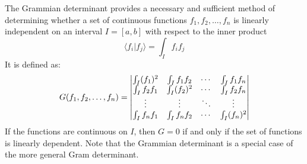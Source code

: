 \documentclass[12pt]{article}
\begin{document}
The Grammian determinant provides a necessary and sufficient method of determining whether a set of continuous functions ${f_1, f_2, \dotsc, f_n}$ is linearly independent on an interval $I = [a, b]$ with respect to the inner product 
$$\langle f_i | f_j\rangle = \int_I f_if_j$$ 
It is defined as:
\[
G(f_1, f_2, \dotsc, f_n) = \left\lvert\begin{array}{@{}cccc@{}}
\int_I (f_1)^2 & \int_I f_1f_2 & \cdots & \int_I f_1f_n\\
\int_I f_2f_1 & \int_I (f_2)^2 & \cdots & \int_I f_2f_n\\
\vdots & \vdots & \ddots & \vdots\\
\int_I f_nf_1 & \int_I f_nf_2 & \cdots & \int_I (f_n)^2\\
\end{array}\right\rvert
\]
If the functions are continuous on $I$, then $G = 0$ if and only if the set of functions is linearly dependent. Note that the Grammian determinant is a special case of the more general Gram determinant.
\end{document}
